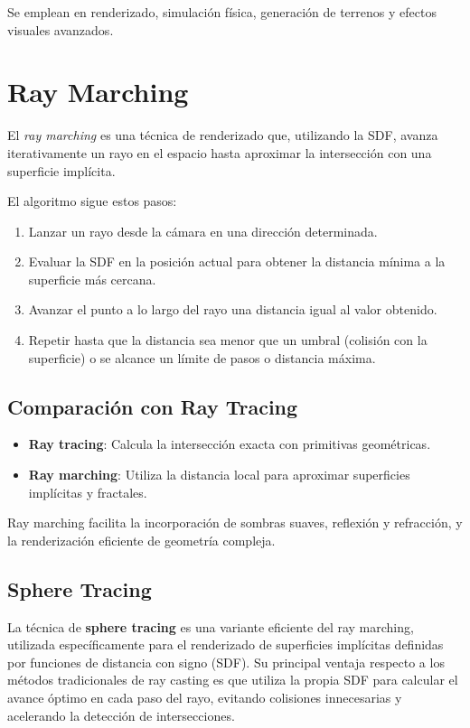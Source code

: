Se emplean en renderizado, simulación física, generación de terrenos y efectos
visuales avanzados.

\section{Ray Marching}

El \textit{ray marching} es una técnica de renderizado que, utilizando la SDF,
avanza iterativamente un rayo en el espacio hasta aproximar la intersección con
una superficie implícita.

El algoritmo sigue estos pasos:

\begin{enumerate}
    \item Lanzar un rayo desde la cámara en una dirección determinada.
    \item Evaluar la SDF en la posición actual para obtener la distancia mínima a la
          superficie más cercana.
    \item Avanzar el punto a lo largo del rayo una distancia igual al valor obtenido.
    \item Repetir hasta que la distancia sea menor que un umbral (colisión con la
          superficie) o se alcance un límite de pasos o distancia máxima.
\end{enumerate}

\subsection{Comparación con Ray Tracing}

\begin{itemize}
    \item \textbf{Ray tracing}: Calcula la intersección exacta con primitivas geométricas.
    \item \textbf{Ray marching}: Utiliza la distancia local para aproximar superficies implícitas y fractales.
\end{itemize}

Ray marching facilita la incorporación de sombras suaves, reflexión y
refracción, y la renderización eficiente de geometría compleja.

\subsection{Sphere Tracing}

La técnica de \textbf{sphere tracing} es una variante eficiente del ray
marching, utilizada específicamente para el renderizado de superficies
implícitas definidas por funciones de distancia con signo (SDF). Su principal
ventaja respecto a los métodos tradicionales de ray casting es que utiliza la
propia SDF para calcular el avance óptimo en cada paso del rayo, evitando
colisiones innecesarias y acelerando la detección de intersecciones.

